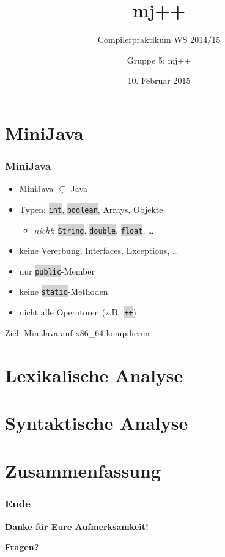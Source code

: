 \documentclass[18pt]{beamer}
\title[]{mj++}
\subtitle{Compilerpraktikum WS 2014/15}
\author{Gruppe 5: mj++}
\date{10. Februar 2015}
\institute{Institut für Programmstrukturen und Datenorganistation}
\newcommand{\code}[1]{\colorbox{lightgray}{\texttt{\upshape #1}}}
\begin{document}

\begin{frame}
\titlepage
\end{frame}


\section{MiniJava}

\begin{frame}
    \frametitle{MiniJava}
    \begin{itemize}
        \item MiniJava $\subsetneq$ Java
        \item Typen: \code{int}, \code{boolean}, Arrays, Objekte
            \begin{itemize}
                \item \emph{nicht}: \code{String}, \code{double}, \code{float}, \ldots
            \end{itemize}
        \item keine Vererbung, Interfaces, Exceptions, \ldots
        \item nur \code{public}-Member
        \item keine \code{static}-Methoden
        \item nicht alle Operatoren (z.B.\ \code{++})
    \end{itemize}
    \vskip 1cm
    \begin{center}
        Ziel: MiniJava auf x86\_64 kompilieren
    \end{center}
\end{frame}

\section{Lexikalische Analyse}


\section{Syntaktische Analyse}


\section{Zusammenfassung}


\begin{frame}
	\frametitle{Ende}
	\Large
	\centerline{\textbf{Danke für Eure Aufmerksamkeit!}}
	\vspace{1cm}
	\centerline{\textbf{Fragen?}}
\end{frame}
\end{document}
